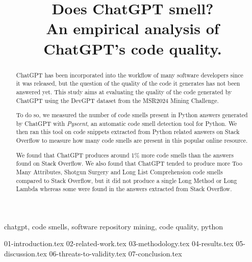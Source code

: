 \documentclass[conference]{IEEEtran}
\begin{document}
\title{Does ChatGPT smell?\\
{\footnotesize An empirical analysis of ChatGPT's code quality.}
}

\author{
}

\maketitle

\begin{abstract}
    ChatGPT has been incorporated into the workflow of many software developers since it was released, but the question of the quality of the code it generates has not been answered yet. This study aims at evaluating the quality of the code generated by ChatGPT using the DevGPT dataset from the MSR2024 Mining Challenge.

    To do so, we measured the number of code smells present in Python answers generated by ChatGPT with \textit{Pyscent}, an automatic code smell detection tool for Python. We then ran this tool on code snippets extracted from Python related answers on Stack Overflow to measure how many code smells are present in this popular online resource.

    We found that ChatGPT produces around 1\% more code smells than the answers found on Stack Overflow. We also found that ChatGPT tended to produce more Too Many Attributes, Shotgun Surgery and Long List Comprehension code smells compared to Stack Overflow, but it did not produce a single Long Method or Long Lambda whereas some were found in the answers extracted from Stack Overflow.
\end{abstract}

\begin{IEEEkeywords}
    chatgpt, code smells, software repository mining, code quality, python
\end{IEEEkeywords}


{01-introduction.tex}
{02-related-work.tex}
{03-methodology.tex}
{04-results.tex}
{05-discussion.tex}
{06-threats-to-validity.tex}
{07-conclusion.tex}
\end{document}
